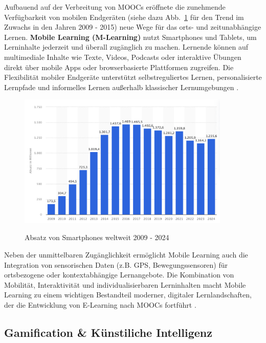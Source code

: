 {{Aufbauend auf der Verbreitung von MOOCs eröffnete die zunehmende Verfügbarkeit von mobilen Endgeräten (siehe dazu Abb.~\ref{fig:absatz_smartphones} für den Trend im Zuwachs in den Jahren 2009 - 2015) neue Wege für das orts- und zeitunabhängige Lernen. \textbf{Mobile Learning (M-Learning)} nutzt Smartphones und Tablets, um Lerninhalte jederzeit und überall zugänglich zu machen. Lernende können auf multimediale Inhalte wie Texte, Videos, Podcasts oder interaktive Übungen direkt über mobile Apps oder browserbasierte Plattformen zugreifen. Die Flexibilität mobiler Endgeräte unterstützt selbstreguliertes Lernen, personalisierte Lernpfade und informelles Lernen außerhalb klassischer Lernumgebungen \parencite[S.~306]{nolting_strukturiertes_2004}.

\begin{figure}[htbp]
    \centering
    \includegraphics[width=0.90\textwidth]{img/Absatz von Smartphones.png}
    \caption{Absatz von Smartphones weltweit 2009 - 2024}
	\cite{statista_absatz_2025}
    \label{fig:absatz_smartphones}
\end{figure}

Neben der unmittelbaren Zugänglichkeit ermöglicht Mobile Learning auch die Integration von sensorischen Daten (z.B. GPS, Bewegungssensoren) für ortsbezogene oder kontextabhängige Lernangebote. Die Kombination von Mobilität, Interaktivität und individualisierbaren Lerninhalten macht Mobile Learning zu einem wichtigen Bestandteil moderner, digitaler Lernlandschaften, der die Entwicklung von E‑Learning nach MOOCs fortführt \parencite[S.~10]{sharples_theory_2010}.

\subsection{Gamification \& Künstiliche Intelligenz}

}}
